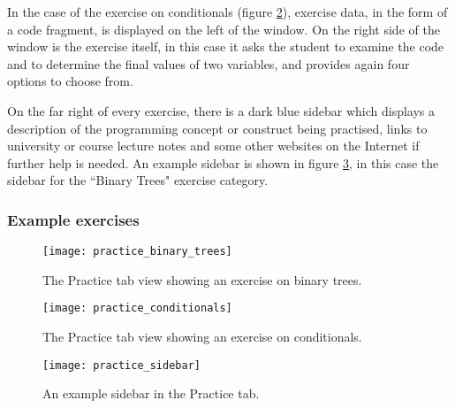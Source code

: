 In the case of the exercise on conditionals (figure \ref{fig:practice_conditionals}), exercise data, in the form of a code fragment, is displayed on the left of the window. On the right side of the window is the exercise itself, in this case it asks the student to examine the code and to determine the final values of two variables, and provides again four options to choose from. \newline

On the far right of every exercise, there is a dark blue sidebar which displays a description of the programming concept or construct being practised, links to university or course lecture notes and some other websites on the Internet if further help is needed. An example sidebar is shown in figure \ref{fig:practice_sidebar}, in this case the sidebar for the ``Binary Trees" exercise category.
\newpage

\subsubsection{Example exercises}

\begin{figure}[H]
\centering
\texttt{[image: practice\_binary\_trees]}
\caption{The Practice tab view showing an exercise on binary trees.}
\label{fig:practice_binary_trees}
\end{figure}

\begin{figure}[H]
\centering
\texttt{[image: practice\_conditionals]}
\caption{The Practice tab view showing an exercise on conditionals.}
\label{fig:practice_conditionals}
\end{figure}

\newpage

\begin{figure}[H]
\centering
\texttt{[image: practice\_sidebar]}
\caption{An example sidebar in the Practice tab.}
\label{fig:practice_sidebar}
\end{figure}


